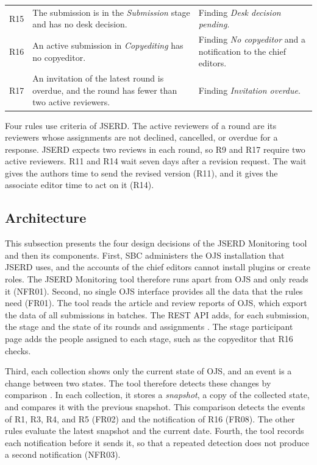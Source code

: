 \documentclass[12pt]{article}
\begin{document}
\begin{table}[!t]
\begin{tabularx}{\textwidth}{@{}p{.75cm}X>{\raggedright\arraybackslash}p{4.3cm}@{}}
R15 & The submission is in the \textit{Submission} stage and has no desk decision. & Finding \textit{Desk decision pending}. \\
R16 & An active submission in \textit{Copyediting} has no copyeditor. & Finding \textit{No copyeditor} and a notification to the chief editors. \\
R17 & An invitation of the latest round is overdue, and the round has fewer than two active reviewers. & Finding \textit{Invitation overdue}. \\
\bottomrule
\end{tabularx}
\end{table}

Four rules use criteria of JSERD. The active reviewers of a round are its
reviewers whose assignments are not declined, cancelled, or overdue for a
response. JSERD expects two reviews in each round, so R9 and R17 require two
active reviewers. R11 and R14 wait seven days after a revision
request. The wait gives the authors time to send the revised version (R11),
and it gives the associate editor time to act on it (R14).

\subsection{Architecture}
\label{sec-architecture}

This subsection presents the four design decisions of the JSERD Monitoring tool and
then its components. First, SBC administers the OJS installation that JSERD
uses, and the accounts of the chief editors cannot install plugins or create
roles. The JSERD Monitoring tool therefore runs apart from OJS and only
reads it (NFR01). Second, no single OJS interface provides all the data
that the rules need (FR01). The tool reads the article and review reports
of OJS, which export the data of all submissions in batches. The REST API
adds, for each submission, the stage and the state of its rounds and
assignments \cite{pkpapi}. The stage participant page adds the people
assigned to each stage, such as the copyeditor that R16 checks.

Third, each collection shows only the current state of OJS, and an event is
a change between two states. The tool therefore detects these changes by
comparison \cite{labio1996}. In each collection, it stores a
\emph{snapshot}, a copy of the collected state, and compares it with the
previous snapshot. This comparison detects the events of R1, R3, R4, and R5
(FR02) and the notification of R16 (FR08). The other rules evaluate the
latest snapshot and the current date. Fourth, the tool records each
notification before it sends it, so that a repeated detection does not
produce a second notification (NFR03).
\end{document}

